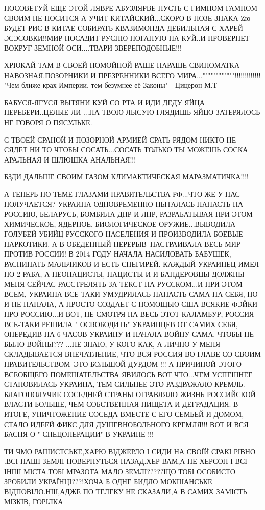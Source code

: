 ПОСОВЕТУЙ ЕЩЕ ЭТОЙ ЛЯВРЕ-АБУЗЛЯРВЕ ПУСТЬ С ГИМНОМ-ГАМНОМ СВОИМ НЕ НОСИТСЯ А
УЧИТ КИТАЙСКИЙ...СКОРО В ПОЗЕ ЗНАКА Zю БУДЕТ РИС В КИТАЕ СОБИРАТЬ КВАЗИМОНДА
ДЕБИЛЬНАЯ С ХАРЕЙ ЭСЭСОВКИ!!МИР ПОСАДИТ РУСНЮ ПОГАНУЮ НА КУЙ..И ПРОВЕРНЕТ
ВОКРУГ ЗЕМНОЙ ОСИ....ТВАРИ ЗВЕРЕПОДОБНЫЕ!!!

ХРЮКАЙ ТАМ В СВОЕЙ ПОМОЙНОЙ РАШЕ-ПАРАШЕ СВИНОМАТКА НАВОЗНАЯ.ПОЗОРНИКИ И
ПРЕЗРЕННИКИ ВСЕГО МИРА...""""""""""""!!!!!!!!!!!!!
"Чем ближе крах Империи, тем безумнее её Законы" - Цицерон М.Т

БАБУСЯ-ЯГУСЯ ВЫТЯНИ КУЙ СО РТА И ИДИ ДЕДУ ЯЙЦА ПЕРЕБЕРИ..ЦЕЛЫЕ ЛИ ...НА ТВОЮ
ЛЫСУЮ ГЛЯДИШЬ ЯЙЦО ЗАТЕРЯЛОСЬ НЕ ГОВОРЯ О ПЯСУЛЬКЕ.

С ТВОЕЙ СРАНОЙ И ПОЗОРНОЙ АРМИЕЙ СРАТЬ РЯДОМ НИКТО НЕ СЯДЕТ НИ ТО ЧТОБЫ
СОСАТЬ...СОСАТЬ ТОЛЬКО ТЫ МОЖЕШЬ СОСКА АРАЛЬНАЯ И ШЛЮШКА АНАЛЬНАЯ!!!

БЗДИ ДАЛЬШЕ СВОИМ ГАЗОМ КЛИМАКТИЧЕСКАЯ МАРАЗМАТИЧКА!!!!

А ТЕПЕРЬ ПО ТЕМЕ ГЛАЗАМИ ПРАВИТЕЛЬСТВА РФ...ЧТО ЖЕ У НАС ПОЛУЧАЕТСЯ? УКРАИНА
ОДНОВРЕМЕННО ПЫТАЛАСЬ НАПАСТЬ НА РОССИЮ, БЕЛАРУСЬ, БОМБИЛА ДНР И ЛНР,
РАЗРАБАТЫВАЯ ПРИ ЭТОМ ХИМИЧЕСКОЕ, ЯДЕРНОЕ, БИОЛОГИЧЕСКОЕ ОРУЖИЕ...ВЫВОДИЛА
ГОЛУБЕЙ-УБИЙЦ РУССКОГО НАСЕЛЕНИЯ И ПРОИЗВОДИЛА БОЕВЫЕ НАРКОТИКИ, А В ОБЕДЕННЫЙ
ПЕРЕРЫВ--НАСТРАИВАЛА ВЕСЬ МИР ПРОТИВ РОССИИ! В 2014 ГОДУ НАЧАЛА НАСИЛОВАТЬ
БАБУШЕК, РАСПИНАТЬ МАЛЬЧИКОВ И ЕСТЬ СНЕГИРЕЙ. КАЖДЫЙ УКРАИНЕЦ ИМЕЛ ПО 2 РАБА, А
НЕОНАЦИСТЫ, НАЦИСТЫ И И БАНДЕРОВЦЫ ДОЛЖНЫ МЕНЯ СЕЙЧАС РАССТРЕЛЯТЬ ЗА ТЕКСТ НА
РУССКОМ...И ПРИ ЭТОМ ВСЕМ, УКРАИНА ВСЕ-ТАКИ УМУДРИЛАСЬ НАПАСТЬ САМА НА СЕБЯ, НО
И НЕ НАПАЛА, А ПРОСТО СОЗДАЕТ С ПОМОЩЬЮ США ВСЯКИЕ ФЭЙКИ ПРО РОССИЮ...И ВОТ, НЕ
СМОТРЯ НА ВЕСЬ ЭТОТ КАЛАМБУР, РОССИЯ ВСЕ-ТАКИ РЕШИЛА " ОСВОБОДИТЬ" УКРАИНЦЕВ ОТ
САМИХ СЕБЯ, ОПЕРЕДИВ НА 6 ЧАСОВ УКРАИНУ И НАЧАЛА ВОЙНУ САМА, ЧТОБЫ НЕ БЫЛО
ВОЙНЫ??? ...НЕ ЗНАЮ, У КОГО КАК, А ЛИЧНО У МЕНЯ СКЛАДЫВАЕТСЯ ВПЕЧАТЛЕНИЕ, ЧТО
ВСЯ РОССИЯ ВО ГЛАВЕ СО СВОИМ ПРАВИТЕЛЬСТВОМ--ЭТО БОЛЬШОЙ ДУРДОМ !!! А ПРИЧИНОЙ
ЭТОГО ВСЕОБЩЕГО ПОМЕШАТЕЛЬСТВА ЯВИЛОСЬ ВОТ ЧТО...ЧЕМ УСПЕШНЕЕ СТАНОВИЛАСЬ
УКРАИНА, ТЕМ СИЛЬНЕЕ ЭТО РАЗДРАЖАЛО КРЕМЛЬ. БЛАГОПОЛУЧИЕ СОСЕДНЕЙ СТРАНЫ
ОТРАВЛЯЛО ЖИЗНЬ РОССИЙСКОЙ ВЛАСТИ БОЛЬШЕ, ЧЕМ СОБСТВЕННАЯ НИЩЕТА И ДЕГРАДАЦИЯ.
В ИТОГЕ, УНИЧТОЖЕНИЕ СОСЕДА ВМЕСТЕ С ЕГО СЕМЬЕЙ И ДОМОМ, СТАЛО ИДЕЕЙ ФИКС ДЛЯ
ДУШЕВНОБОЛЬНОГО КРЕМЛЯ!!! ВОТ И ВСЯ БАСНЯ О " СПЕЦОПЕРАЦИИ" В УКРАИНЕ !!!

ТИ ЧМО РАШИСТСЬКЕ,ХАРЮ ВІДЖЕРЛО І СИДИ НА СВОЇЙ СРАКІ РІВНО .ВСІ НАШІ ЗЕМЛІ
ПОВЕРНУТЬСЯ НАЗАД.ХЕР ВАМ,А НЕ ХЕРСОН І ВСІ ІНШІ МІСТА.ТОБІ МРАЗОТА МАЛО
ЗЕМЛІ?????ЩО ТОБІ ОСОБИСТО ЗРОБИЛИ УКРАЇНЦІ???!ХОЧА Б ОДНЕ БИДЛО МОКШАНСЬКЕ
ВІДПОВІЛО.НІІІ,АДЖЕ ПО ТЕЛЕКУ НЕ СКАЗАЛИ,А В САМИХ ЗАМІСТЬ МІЗКІВ, ГОРІЛКА

